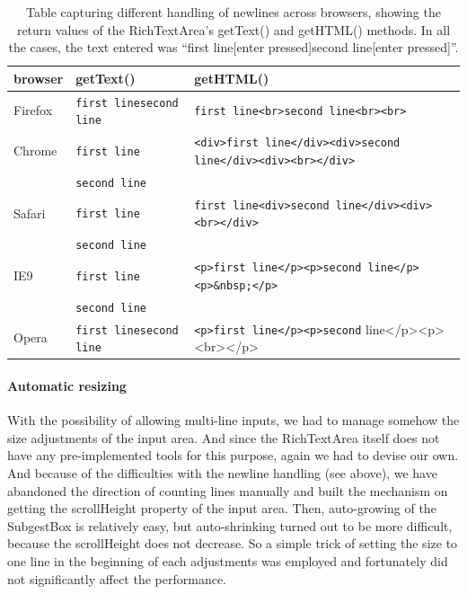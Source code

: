 \begin{table}[h]
\begin{center}
\begin{tabular}{|l|l|l|}
\hline
browser & getText()             & getHTML() \\
\hline
Firefox & \verb=first linesecond line= & \verb=first line<br>second line<br><br>= \\
\hline
Chrome  & \verb=first line=            & \verb=<div>first line</div><div>second line</div><div><br></div>= \\
        & \verb=second line=           & \\ 
\hline
Safari  & \verb=first line=            & \verb=first line<div>second line</div><div><br></div>= \\
        & \verb=second line=           & \\
\hline
IE9     & \verb=first line=            & \verb=<p>first line</p><p>second line</p><p>&nbsp;</p>= \\
        & \verb=second line=           & \\
\hline
Opera   & \verb=first linesecond line= & \verb=<p>first line</p><p>second= line</p><p><br></p> \\
\hline
\end{tabular}
\end{center}
\caption{Table capturing different handling of newlines across browsers, showing the return values of the RichTextArea's getText() and getHTML() methods. In all the cases, the text entered was ``first line[enter pressed]second line[enter pressed]''.}\label{implprocess:RichTextAreaNewlines}
\end{table}

\paragraph{Automatic resizing}
With the possibility of allowing multi-line inputs, we had to manage somehow the size adjustments of the input area. And since the RichTextArea itself does not have any pre-implemented tools for this purpose, again we had to devise our own. And because of the difficulties with the newline handling (see above), we have abandoned the direction of counting lines manually and built the mechanism on getting the scrollHeight property of the input area. Then, auto-growing of the SubgestBox is relatively easy, but auto-shrinking turned out to be more difficult, because the scrollHeight does not decrease. So a simple trick of setting the size to one line in the beginning of each adjustments was employed and fortunately did not significantly affect the performance.

